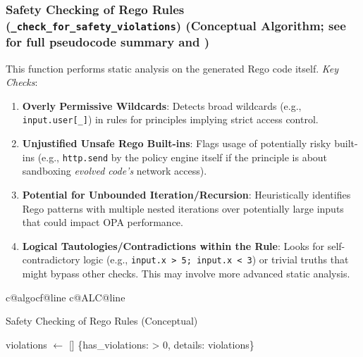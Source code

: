 \documentclass[sigconf,natbib]{acmart}
\makeatletter
\newcounter{algcounter}
\newcounter{alglinegs}
\newcounter{alglinepgc}
\newcounter{alglinevalidation}
\newcounter{alglinesafety}
\newcounter{alglineconflict}
\newcounter{alglinebias}
\newcommand{\resetalglineno}{%
  \stepcounter{algcounter}%
  \setcounter{ALG@line}{0}%
  \setcounter{alglinegs}{0}%
  \setcounter{alglinepgc}{0}%
  \setcounter{alglinevalidation}{0}%
  \setcounter{alglinesafety}{0}%
  \setcounter{alglineconflict}{0}%
  \setcounter{alglinebias}{0}%
  \ifcsname c@algocf@line\endcsname\setcounter{algocf@line}{0}\fi%
  \ifcsname c@ALC@line\endcsname\setcounter{ALC@line}{0}\fi%
}
\makeatother
\begin{document}
\subsubsection[Safety Checking of Rego Rules]{Safety Checking of Rego Rules (\texttt{\_check\_for\_safety\_violations}) (Conceptual Algorithm; see  for full pseudocode summary and )}
\label{app:safety_checking_subsection}
This function performs static analysis on the generated Rego code itself. \textit{Key Checks}:
\begin{enumerate}
    \item \textbf{Overly Permissive Wildcards}: Detects broad wildcards (e.g., \texttt{input.user[\_]}) in rules for principles implying strict access control.
    \item \textbf{Unjustified Unsafe Rego Built-ins}: Flags usage of potentially risky built-ins (e.g., \texttt{http.send} by the policy engine itself if the principle is about sandboxing \textit{evolved code's} network access).
    \item \textbf{Potential for Unbounded Iteration/Recursion}: Heuristically identifies Rego patterns with multiple nested iterations over potentially large inputs that could impact OPA performance.
    \item \textbf{Logical Tautologies/Contradictions within the Rule}: Looks for self-contradictory logic (e.g., \texttt{input.x > 5; input.x < 3}) or trivial truths that might bypass other checks. This may involve more advanced static analysis.
\end{enumerate}

\begin{algorithm}[!htbp]
\resetalglineno
\caption{Safety Checking of Rego Rules (Conceptual)}
\label{alg:safety_check_conceptual_appendix}
\begin{algorithmic}[1]
  \State violations $\gets$ []
    \State {}
  \EndIf
    \State {}
  \EndIf
    \State {}
  \EndIf
  \State \Return \{has\_violations:  > 0, details: violations\}
\EndFunction
\end{algorithmic}
\end{algorithm}
\end{document}
